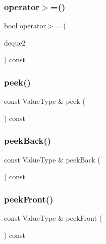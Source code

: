 \subsubsection{\texorpdfstring{operator$>$=()}{operator>=()}}
{\footnotesize\ttfamily bool operator$>$= (\begin{DoxyParamCaption}\item[{const \mbox{\hyperlink{classDeque}{Deque}}$<$ Value\+Type $>$ \&}]{deque2 }\end{DoxyParamCaption}) const}

\mbox{\label{classDeque_a74501ededf728c31068dd28a70a8a1f2}} 
\subsubsection{\texorpdfstring{peek()}{peek()}}
{\footnotesize\ttfamily const Value\+Type \& peek (\begin{DoxyParamCaption}{ }\end{DoxyParamCaption}) const}

\mbox{\label{classDeque_a617bbcedcfbc36e19f4aa806074da07e}} 
\subsubsection{\texorpdfstring{peek\+Back()}{peekBack()}}
{\footnotesize\ttfamily const Value\+Type \& peek\+Back (\begin{DoxyParamCaption}{ }\end{DoxyParamCaption}) const}

\mbox{\label{classDeque_a7bac5f26f5665291d89e8de29496ee79}} 
\subsubsection{\texorpdfstring{peek\+Front()}{peekFront()}}
{\footnotesize\ttfamily const Value\+Type \& peek\+Front (\begin{DoxyParamCaption}{ }\end{DoxyParamCaption}) const}

\mbox{\label{classDeque_a025ec97fa5b04552f5ad0902c1f02ac1}} 

